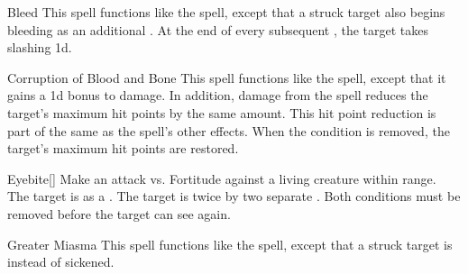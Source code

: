 \lowercase{\hypertarget{spell:Bleed}{}}\label{spell:Bleed}
\begin{ability}[\nth{3}]{\hypertarget{spell:Bleed}{Bleed}}
This spell functions like the  spell, except that a struck target also begins bleeding as an additional .
At the end of every subsequent , the target takes slashing  \minus1d.
\end{ability}
\vspace{0.25em}



\lowercase{\hypertarget{spell:Corruption of Blood and Bone}{}}\label{spell:Corruption of Blood and Bone}
\begin{ability}[\nth{3}]{\hypertarget{spell:Corruption of Blood and Bone}{Corruption of Blood and Bone}}
This spell functions like the  spell, except that it gains a \plus1d bonus to damage.
In addition, damage from the spell reduces the target's maximum hit points by the same amount.
This hit point reduction is part of the same  as the spell's other effects.
When the condition is removed, the target's maximum hit points are restored.
\end{ability}
\vspace{0.25em}



\lowercase{\hypertarget{spell:Eyebite}{}}\label{spell:Eyebite}
\begin{ability}[\nth{3}]{\hypertarget{spell:Eyebite}{Eyebite}}[]
Make an attack vs. Fortitude against a living creature within \rngclose range.
\hit The target is  as a .
\crit The target is  twice by two separate .
Both conditions must be removed before the target can see again.
\end{ability}
\vspace{0.25em}



\lowercase{\hypertarget{spell:Greater Miasma}{}}\label{spell:Greater Miasma}
\begin{ability}[\nth{3}]{\hypertarget{spell:Greater Miasma}{Greater Miasma}}
This spell functions like the  spell, except that a struck target is  instead of sickened.
\end{ability}
\vspace{0.25em}



